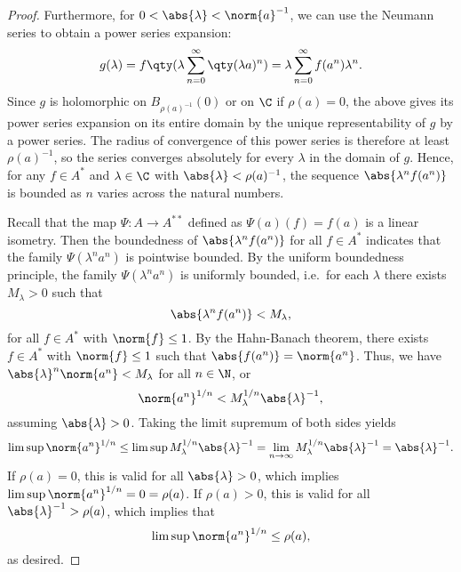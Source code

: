 \begin{proof}
Furthermore, for $0 < \abs{\lambda} < \norm{a}^{-1}$, we can use the Neumann series to obtain a power series expansion:
\begin{equation}
g(\lambda) = f\qty(\lambda \sum_{n=0}^\infty \qty(\lambda a)^n ) = \lambda \sum_{n=0}^\infty f(a^n) \lambda^n.
\end{equation}
Since $g$ is holomorphic on $B_{\rho(a)^{-1}}(0)$ or on $\C$ if $\rho(a) = 0$, the above gives its power series expansion on its entire domain by the unique representability of $g$ by a power series. The radius of convergence of this power series is therefore at least $\rho(a)^{-1}$, so the series converges absolutely for every $\lambda$ in the domain of $g$. Hence, for any $f \in A^*$ and $\lambda \in \C$ with $\abs{\lambda} < \rho(a)^{-1}$, the sequence $\abs{\lambda^n f(a^n)}$ is bounded as $n$ varies across the natural numbers. 

Recall that the map $\Psi: A \rightarrow A^{**}$ defined as $\Psi(a)(f) = f(a)$ is a linear isometry. Then the boundedness of $\abs{\lambda^n f(a^n)}$ for all $f \in A^*$ indicates that the family $\Psi(\lambda^n a^n)$ is pointwise bounded. By the uniform boundedness principle, the family $\Psi(\lambda^n a^n)$ is uniformly bounded, i.e.\ for each $\lambda$ there exists $M_\lambda > 0$ such that
\begin{equation}
\abs{\lambda^n f(a^n)} < M_\lambda,
\end{equation}
for all $f \in A^*$ with $\norm{f} \leq 1$. By the Hahn-Banach theorem, there exists $f \in A^*$ with $\norm{f} \leq 1$ such that $\abs{f(a^n)} = \norm{a^n}$. Thus, we have $\abs{\lambda}^n \norm{a^n} < M_\lambda$ for all $n \in \N$, or
\begin{equation}
\norm{a^n}^{1/n} < M_\lambda^{1/n} \abs{\lambda}^{-1},
\end{equation}
assuming $\abs{\lambda} > 0$. Taking the limit supremum of both sides yields
\begin{equation}
\limsup \norm{a^n}^{1/n} \leq \limsup M^{1/n}_\lambda \abs{\lambda}^{-1} = \lim_{n \rightarrow \infty} M_\lambda^{1/n} \abs{\lambda}^{-1} = \abs{\lambda}^{-1}.
\end{equation}
If $\rho(a) = 0$, this is valid for all $\abs{\lambda} > 0$, which implies $\limsup \norm{a^n}^{1/n} = 0 = \rho(a)$. If $\rho(a) > 0$, this is valid for all $\abs{\lambda}^{-1} > \rho(a)$, which implies that 
\begin{equation}
\limsup \norm{a^n}^{1/n} \leq \rho(a),
\end{equation}
as desired.
\end{proof}

